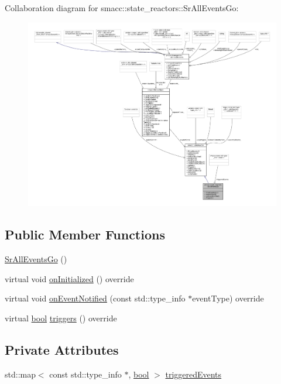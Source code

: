 Collaboration diagram for smacc\+:\+:state\+\_\+reactors\+:\+:Sr\+All\+Events\+Go\+:
\nopagebreak
\begin{figure}[H]
\begin{center}
\leavevmode
\includegraphics[width=350pt]{classsmacc_1_1state__reactors_1_1SrAllEventsGo__coll__graph}
\end{center}
\end{figure}
\subsection*{Public Member Functions}
\begin{DoxyCompactItemize}
\item 
\hyperlink{classsmacc_1_1state__reactors_1_1SrAllEventsGo_a22492ff31d435e29b972a04855cde3bd}{Sr\+All\+Events\+Go} ()
\item 
virtual void \hyperlink{classsmacc_1_1state__reactors_1_1SrAllEventsGo_adda075f2b3ec56115d02e9fb1a1c26fe}{on\+Initialized} () override
\item 
virtual void \hyperlink{classsmacc_1_1state__reactors_1_1SrAllEventsGo_abd72dc79374c34111d24691c459850c2}{on\+Event\+Notified} (const std\+::type\+\_\+info $\ast$event\+Type) override
\item 
virtual \hyperlink{classbool}{bool} \hyperlink{classsmacc_1_1state__reactors_1_1SrAllEventsGo_ab752043eda070661d2a676b580c679b7}{triggers} () override
\end{DoxyCompactItemize}
\subsection*{Private Attributes}
\begin{DoxyCompactItemize}
\item 
std\+::map$<$ const std\+::type\+\_\+info $\ast$, \hyperlink{classbool}{bool} $>$ \hyperlink{classsmacc_1_1state__reactors_1_1SrAllEventsGo_a2c3d7c7e15ed155ae6e83fe49e7897e9}{triggered\+Events}
\end{DoxyCompactItemize}
